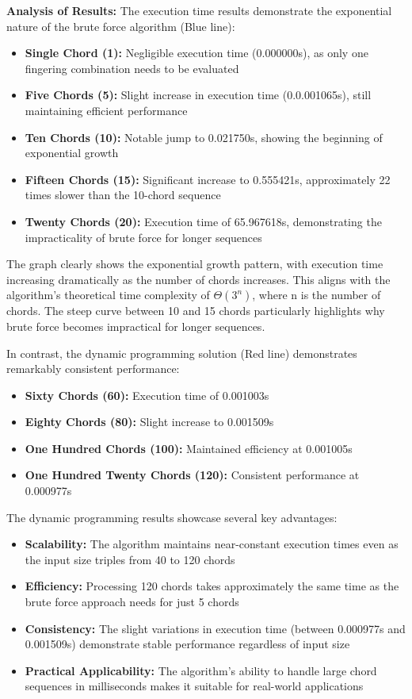 \documentclass[conference]{IEEEtran}
\begin{document}
\textbf{Analysis of Results:}
The execution time results demonstrate the exponential nature of the brute force algorithm (Blue line):

\begin{itemize}
    \item \textbf{Single Chord (1):} Negligible execution time (0.000000s), as only one fingering combination needs to be evaluated
    \item \textbf{Five Chords (5):} Slight increase in execution time (0.0.001065s), still maintaining efficient performance
    \item \textbf{Ten Chords (10):} Notable jump to 0.021750s, showing the beginning of exponential growth
    \item \textbf{Fifteen Chords (15):} Significant increase to 0.555421s, approximately 22 times slower than the 10-chord sequence
    \item \textbf{Twenty Chords (20):} Execution time of 65.967618s, demonstrating the impracticality of brute force for longer sequences
\end{itemize}

The graph clearly shows the exponential growth pattern, with execution time increasing dramatically as the number of chords increases. This aligns with the algorithm's theoretical time complexity of \(\Theta(3^n)\), where n is the number of chords. The steep curve between 10 and 15 chords particularly highlights why brute force becomes impractical for longer sequences.

In contrast, the dynamic programming solution (Red line) demonstrates remarkably consistent performance:

\begin{itemize}
    \item \textbf{Sixty Chords (60):} Execution time of 0.001003s
    \item \textbf{Eighty Chords (80):} Slight increase to 0.001509s
    \item \textbf{One Hundred Chords (100):} Maintained efficiency at 0.001005s
    \item \textbf{One Hundred Twenty Chords (120):} Consistent performance at 0.000977s
\end{itemize}

The dynamic programming results showcase several key advantages:

\begin{itemize}
    \item \textbf{Scalability:} The algorithm maintains near-constant execution times even as the input size triples from 40 to 120 chords
    \item \textbf{Efficiency:} Processing 120 chords takes approximately the same time as the brute force approach needs for just 5 chords
    \item \textbf{Consistency:} The slight variations in execution time (between 0.000977s and 0.001509s) demonstrate stable performance regardless of input size
    \item \textbf{Practical Applicability:} The algorithm's ability to handle large chord sequences in milliseconds makes it suitable for real-world applications
\end{itemize}
\end{document}
